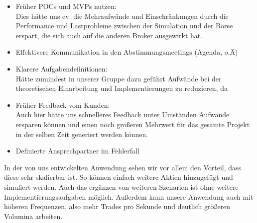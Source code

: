 	\begin{itemize}
		\item Früher POCs und MVPs nutzen: \\
			Dies hätte uns ev. die Mehraufwände und Einschränkungen durch die Performance und Lastprobleme zwischen der Simulation und der Börse erspart, die sich auch auf die anderen Broker ausgewirkt hat. 
		\item Effektivere Kommunikation in den Abstimmungsmeetings (Agenda, o.Ä)
		\item Klarere Aufgabendefinitionen: \\
			Hätte zumindest in unserer Gruppe dazu geführt Aufwände bei der theoretischen Einarbeitung und Implementierungen zu reduzieren, da
		\item Früher Feedback vom Kunden: \\
			Auch hier hätte uns schnelleres Feedback unter Umständen Aufwände ersparen können und einen noch größeren Mehrwert für das gesamte Projekt in der selben Zeit generiert werden können. 
		\item Definierte Ansprechpartner im Fehlerfall
		
	\end{itemize}

In der von uns entwickelten Anwendung sehen wir vor allem den Vorteil, dass diese sehr skalierbar ist. So können einfach weitere Aktien hinzugefügt und simuliert werden. Auch das ergänzen von weiteren Szenarien ist ohne weitere Implementierungsaufgaben möglich. Außerdem kann unsere Anwendung auch mit höheren Frequenzen, also mehr Trades pro Sekunde und deutlich größeren Volumina arbeiten.  